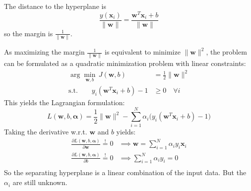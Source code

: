 \documentclass[a4paper, 11pt, accentcolor = tud3b]{tudreport}
\renewcommand{\vec}[1]{\mathbf{#1}}
\begin{document}
				The distance to the hyperplane is
				\begin{equation}
					\frac{y(\vec{x}_i)}{\lVert \vec{w} \rVert} = \frac{\vec{w}^T \vec{x}_i + b}{\lVert \vec{w} \rVert}
				\end{equation}
				so the margin is \( \frac{1}{\lVert \vec{w} \rVert} \).
				
				As maximizing the margin \( \frac{1}{\lVert \vec{w} \rVert} \) is equivalent to minimize \( \lVert \vec{w} \rVert^2 \), the problem can be formulated as a quadratic minimization problem with linear constraints:
				\begin{align}
					\arg\min_{ \vec{w}, b } \, J(\vec{w}, b) &= \frac{1}{2} \lVert \vec{w} \rVert^2 \\
					\textrm{s.t.} \qquad
					y_i (\vec{w}^T \vec{x}_i + b) - 1 &\geq 0 \quad\forall i
				\end{align}
				This yields the Lagrangian formulation:
				\begin{equation}
					L(\vec{w}, b, \vec{\alpha}) = \frac{1}{2} \lVert \vec{w} \rVert^2 - \sum_{i = 1}^{N} \alpha_i \big( y_i (\vec{w}^T \vec{x}_i + b) - 1 \big)
				\end{equation}
				Taking the derivative w.r.t. \(\vec{w}\) and \(b\) yields:
				\begin{align}
					\frac{\partial L(\vec{w}, b, \vec{\alpha})}{\partial \vec{w}} \overset{!}{=} 0 &\implies \vec{w} = \sum_{i = 1}^{N} \alpha_i y_i \vec{x}_i \label{eq:primal1} \\
					\frac{\partial L(\vec{w}, b, \vec{\alpha})}{\partial b} \overset{!}{=} 0 &\implies \sum_{i = 1}^{N} \alpha_i y_i = 0 \label{eq:primal2} \\
				\end{align}
				So the separating hyperplane is a linear combination of the input data. But the \(\alpha_i\) are still unknown.
\end{document}
